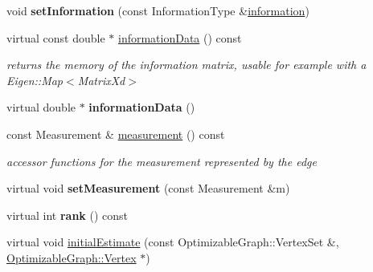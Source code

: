 \begin{DoxyCompactItemize}
\item 
\hypertarget{classg2o_1_1BaseEdge_a9bb871a94d2413ec3113a147417f2dc4}{void {\bfseries set\-Information} (const Information\-Type \&\hyperlink{classg2o_1_1BaseEdge_ab682086df7223ce2b039d652416ddc23}{information})}\label{classg2o_1_1BaseEdge_a9bb871a94d2413ec3113a147417f2dc4}

\item 
\hypertarget{classg2o_1_1BaseEdge_a49791e1acda790a7819388e60d80ed50}{virtual const double $\ast$ \hyperlink{classg2o_1_1BaseEdge_a49791e1acda790a7819388e60d80ed50}{information\-Data} () const }\label{classg2o_1_1BaseEdge_a49791e1acda790a7819388e60d80ed50}

\begin{DoxyCompactList}\small\item\em returns the memory of the information matrix, usable for example with a Eigen\-::\-Map$<$\-Matrix\-Xd$>$ \end{DoxyCompactList}\item 
\hypertarget{classg2o_1_1BaseEdge_a72ae9d215d6abc892f735e3d3ab81a88}{virtual double $\ast$ {\bfseries information\-Data} ()}\label{classg2o_1_1BaseEdge_a72ae9d215d6abc892f735e3d3ab81a88}

\item 
\hypertarget{classg2o_1_1BaseEdge_a8c20e7ffa66bb7a4a02c8cee82e89c8b}{const Measurement \& \hyperlink{classg2o_1_1BaseEdge_a8c20e7ffa66bb7a4a02c8cee82e89c8b}{measurement} () const }\label{classg2o_1_1BaseEdge_a8c20e7ffa66bb7a4a02c8cee82e89c8b}

\begin{DoxyCompactList}\small\item\em accessor functions for the measurement represented by the edge \end{DoxyCompactList}\item 
\hypertarget{classg2o_1_1BaseEdge_a24aae7b4fc35d311158f104cfdd95aeb}{virtual void {\bfseries set\-Measurement} (const Measurement \&m)}\label{classg2o_1_1BaseEdge_a24aae7b4fc35d311158f104cfdd95aeb}

\item 
\hypertarget{classg2o_1_1BaseEdge_a56269f26521052cf52de8a61c37e4c29}{virtual int {\bfseries rank} () const }\label{classg2o_1_1BaseEdge_a56269f26521052cf52de8a61c37e4c29}

\item 
virtual void \hyperlink{classg2o_1_1BaseEdge_a0c3d9763f1dc504627df75e0f381ca70}{initial\-Estimate} (const Optimizable\-Graph\-::\-Vertex\-Set \&, \hyperlink{classg2o_1_1OptimizableGraph_1_1Vertex}{Optimizable\-Graph\-::\-Vertex} $\ast$)
\end{DoxyCompactItemize}

